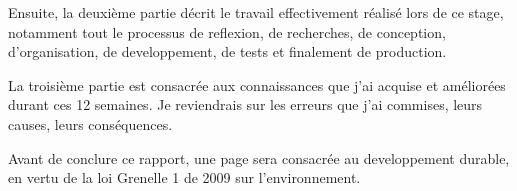 Ensuite, la deuxième partie décrit le travail effectivement réalisé lors de ce stage, notamment tout le processus de reflexion, de recherches, de conception, d'organisation, de developpement, de tests et finalement de production.

La troisième partie est consacrée aux connaissances que j'ai acquise et améliorées durant ces 12 semaines. Je reviendrais sur les erreurs que j'ai commises, leurs causes, leurs conséquences.

Avant de conclure ce rapport, une page sera consacrée au developpement durable, en vertu de la loi Grenelle 1 de 2009 sur l'environnement.





















%

